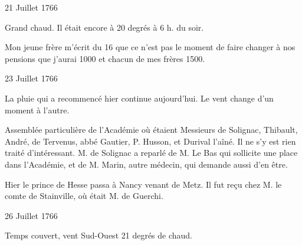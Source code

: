                      \begin{diary}{21 Juillet 1766}{}
                        
                         Grand chaud. Il était encore à
                              20 degrés à 6 h.
                              du soir. \bigskip
        
        
                        
                           Mon jeune frère m'écrit
                           du 16 que ce n'est
                           pas le moment de faire changer à nos pensions
                           que j'aurai 1000 et chacun de mes frères
                              1500\up{#}. \bigskip
        
        
                     \end{diary}
                     \begin{diary}{23 Juillet 1766}{}
                        
                         La pluie qui a recommencé hier continue
                           aujourd'hui. Le vent change d'un moment à l'autre. \bigskip
        
        
                         Assemblée particulière de l'Académie où étaient
                           Messieurs
                           de Solignac, Thibault, André, de Tervenus,
                           abbé Gautier, P. Husson, et Durival l'aîné. Il ne
                           s'y est rien traité d'intéressant. M.
                              de Solignac
                           a reparlé de M. Le Bas qui
                           sollicite une place
                           dans l'Académie, et de
                              M. Marin, autre
                           médecin, qui demande aussi d'en être. \bigskip
        
        
                         Hier le
                              prince de Hesse passa à Nancy
                           venant de Metz. Il fut reçu chez
                           M.
                              le comte de Stainville, où était M. de Guerchi.
                        \bigskip
        
        
                     \end{diary}

                     \begin{diary}{26 Juillet 1766}{}
                        
                        
                           Temps couvert, vent Sud-Ouest 21 degrés de chaud. \bigskip
        
        
                     \end{diary}

